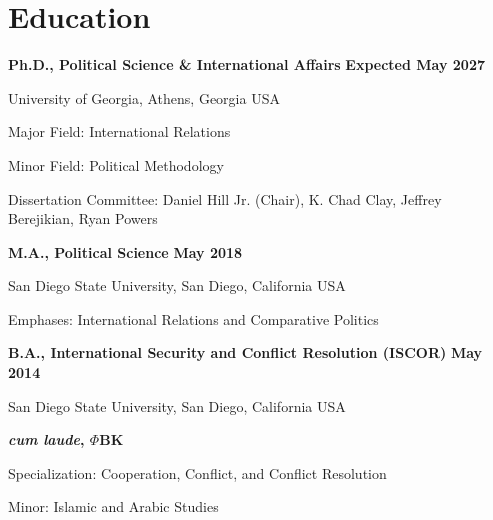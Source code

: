 \documentclass[letterpaper,12pt]{article}
\newenvironment{list1}{
  \begin{list}{}{
      \setlength{\itemsep}{0in}
      \setlength{\parsep}{0in} \setlength{\parskip}{0in}
      \setlength{\topsep}{0in} \setlength{\partopsep}{0in} 
      \setlength{\leftmargin}{0in}}}{\end{list}}
\begin{document}
\section{Education}
{\bf Ph.D., Political Science \& International Affairs} \hfill {\bf Expected May 2027}
\begin{list1} 
\item University of Georgia, Athens, Georgia USA
\item Major Field: International Relations
\item Minor Field: Political Methodology
\item Dissertation Committee:  Daniel Hill Jr. (Chair), K. Chad Clay, Jeffrey Berejikian, Ryan Powers
\end{list1}
\par
{\bf M.A., Political Science} \hfill {\bf May 2018}
\begin{list1} 
\item San Diego State University, San Diego, California USA
\item Emphases: International Relations and Comparative Politics
\end{list1}
\par
{\bf B.A., International Security and Conflict Resolution (ISCOR)} \hfill {\bf May 2014}
\begin{list1} 
\item San Diego State University, San Diego, California USA
\item \textbf{\textit{cum laude}, $\Phi$BK}
\item Specialization: Cooperation, Conflict, and Conflict Resolution
\item Minor: Islamic and Arabic Studies
\end{list1}

\end{document}

